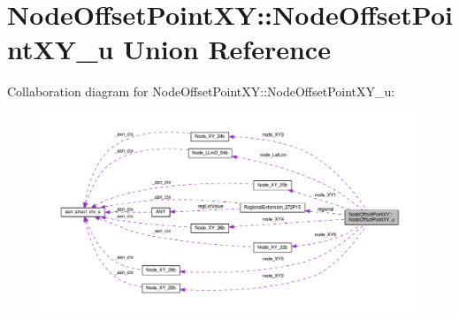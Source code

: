 \hypertarget{unionNodeOffsetPointXY_1_1NodeOffsetPointXY__u}{}\section{Node\+Offset\+Point\+XY\+:\+:Node\+Offset\+Point\+X\+Y\+\_\+u Union Reference}
\label{unionNodeOffsetPointXY_1_1NodeOffsetPointXY__u}


Collaboration diagram for Node\+Offset\+Point\+XY\+:\+:Node\+Offset\+Point\+X\+Y\+\_\+u\+:\nopagebreak
\begin{figure}[H]
\begin{center}
\leavevmode
\includegraphics[width=350pt]{unionNodeOffsetPointXY_1_1NodeOffsetPointXY__u__coll__graph}
\end{center}
\end{figure}

